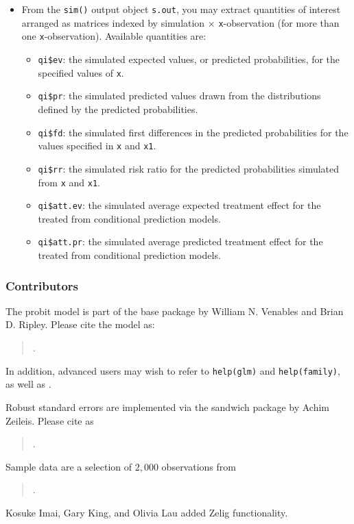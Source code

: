 \begin{itemize}
\item From the {\tt sim()} output object {\tt s.out}, you may extract
  quantities of interest arranged as matrices indexed by simulation
  $\times$ {\tt x}-observation (for more than one {\tt x}-observation).
  Available quantities are:

   \begin{itemize}
   \item {\tt qi\$ev}: the simulated expected values, or predicted
     probabilities, for the specified values of {\tt x}.
   \item {\tt qi\$pr}: the simulated predicted values drawn from the
     distributions defined by the predicted probabilities.  
   \item {\tt qi\$fd}: the simulated first differences in the predicted
     probabilities for the values specified in {\tt x} and {\tt x1}.
   \item {\tt qi\$rr}: the simulated risk ratio for the predicted
     probabilities simulated from {\tt x} and {\tt x1}.
   \item {\tt qi\$att.ev}: the simulated average expected treatment
     effect for the treated from conditional prediction models.  
   \item {\tt qi\$att.pr}: the simulated average predicted treatment
     effect for the treated from conditional prediction models.  
   \end{itemize}
\end{itemize}

\subsubsection{Contributors}

The probit model is part of the base package by William N. Venables
and Brian D. Ripley.  Please cite the model as:
\begin{verse}
.
\end{verse}

In addition, advanced users may wish to refer to \texttt{help(glm)}
and \texttt{help(family)}, as well as \cite{McCNel89}.

Robust standard errors are implemented via the sandwich package
by Achim Zeileis.  Please cite as
\begin{verse}
.
\end{verse}

Sample data are a selection of $2,000$ observations from
\begin{verse}
.
\end{verse}

Kosuke Imai, Gary King, and Olivia Lau added Zelig functionality.  


